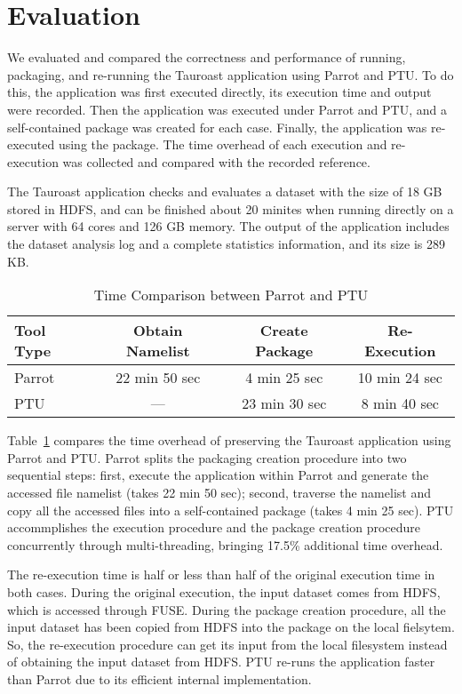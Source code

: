 \section{Evaluation}

We evaluated and compared the correctness and performance of running, packaging, and re-running the Tauroast application using Parrot and PTU.
To do this, the application was first executed directly, its execution time and output were recorded. Then the application was executed under Parrot and PTU, and a self-contained package was created for each case. Finally, the application was re-executed using the package. The time overhead of each execution and re-execution was collected and compared with the recorded reference.

The Tauroast application checks and evaluates a dataset with the size of 18 GB stored in HDFS, and can be finished about 20 minites when running directly on a server with 64 cores and 126 GB memory. The output of the application includes the dataset analysis log and a complete statistics information, and its size is 289 KB.

\begin{table}
    \centering
    \begin{tabular}{lccc}
    \hline
    \bf Tool Type & \bf Obtain Namelist & \bf Create Package & \bf Re-Execution \\ \hline
	Parrot & 22 min 50 sec  & 4 min 25 sec & 10 min 24 sec \\ \hline
	PTU & --- & 23 min 30 sec & 8 min 40 sec \\ \hline 
    \end{tabular}
    \caption{Time Comparison between Parrot and PTU}
    \label{table:parrot_ptu}
\end{table}    

Table~\ref{table:parrot_ptu} compares the time overhead of preserving the Tauroast application using Parrot and PTU.
Parrot splits the packaging creation procedure into two sequential steps: first, execute the application within Parrot and generate the accessed file namelist (takes 22 min 50 sec); second, traverse the namelist and copy all the accessed files into a self-contained package (takes 4 min 25 sec).
PTU accommplishes the execution procedure and the package creation procedure concurrently through multi-threading, bringing 17.5\% additional time overhead.

The re-execution time is half or less than half of the original execution time in both cases. During the original execution, the input dataset comes from HDFS, which is accessed through FUSE. During the package creation procedure, all the input dataset has been copied from HDFS into the package on the local fielsytem. So, the re-execution procedure can get its input from the local filesystem instead of obtaining the input dataset from HDFS.
PTU re-runs the application faster than Parrot due to its efficient internal implementation.


